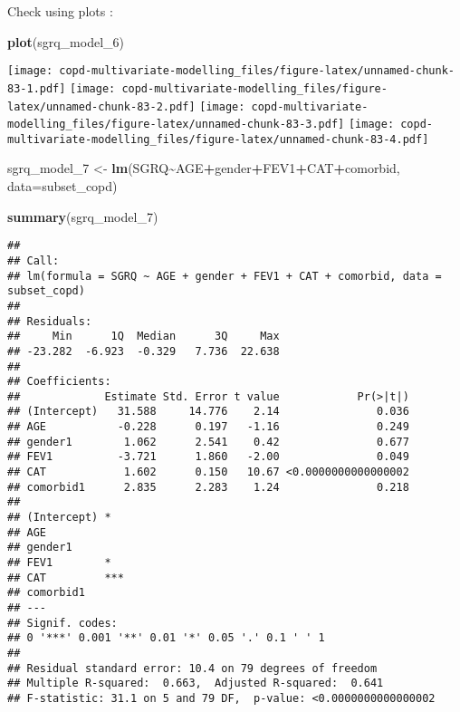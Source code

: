 \documentclass[
]{article}
\newenvironment{Shaded}{\begin{snugshade}}{\end{snugshade}}
\newcommand{\AttributeTok}[1]{\textcolor[rgb]{0.13,0.29,0.53}{#1}}
\newcommand{\FunctionTok}[1]{\textcolor[rgb]{0.13,0.29,0.53}{\textbf{#1}}}
\newcommand{\NormalTok}[1]{#1}
\newcommand{\OtherTok}[1]{\textcolor[rgb]{0.56,0.35,0.01}{#1}}
\newcommand{\SpecialCharTok}[1]{\textcolor[rgb]{0.81,0.36,0.00}{\textbf{#1}}}
\begin{document}
Check using plots :

\begin{Shaded}
\begin{Highlighting}[]
\FunctionTok{plot}\NormalTok{(sgrq\_model\_6)}
\end{Highlighting}
\end{Shaded}

\texttt{[image: copd-multivariate-modelling\_files/figure-latex/unnamed-chunk-83-1.pdf]}
\texttt{[image: copd-multivariate-modelling\_files/figure-latex/unnamed-chunk-83-2.pdf]}
\texttt{[image: copd-multivariate-modelling\_files/figure-latex/unnamed-chunk-83-3.pdf]}
\texttt{[image: copd-multivariate-modelling\_files/figure-latex/unnamed-chunk-83-4.pdf]}

\begin{Shaded}
\begin{Highlighting}[]
\NormalTok{sgrq\_model\_7 }\OtherTok{\textless{}{-}} \FunctionTok{lm}\NormalTok{(SGRQ}\SpecialCharTok{\textasciitilde{}}\NormalTok{AGE}\SpecialCharTok{+}\NormalTok{gender}\SpecialCharTok{+}\NormalTok{FEV1}\SpecialCharTok{+}\NormalTok{CAT}\SpecialCharTok{+}\NormalTok{comorbid, }\AttributeTok{data=}\NormalTok{subset\_copd)}
\end{Highlighting}
\end{Shaded}

\begin{Shaded}
\begin{Highlighting}[]
\FunctionTok{summary}\NormalTok{(sgrq\_model\_7)}
\end{Highlighting}
\end{Shaded}

\begin{verbatim}
## 
## Call:
## lm(formula = SGRQ ~ AGE + gender + FEV1 + CAT + comorbid, data = subset_copd)
## 
## Residuals:
##     Min      1Q  Median      3Q     Max 
## -23.282  -6.923  -0.329   7.736  22.638 
## 
## Coefficients:
##             Estimate Std. Error t value            Pr(>|t|)
## (Intercept)   31.588     14.776    2.14               0.036
## AGE           -0.228      0.197   -1.16               0.249
## gender1        1.062      2.541    0.42               0.677
## FEV1          -3.721      1.860   -2.00               0.049
## CAT            1.602      0.150   10.67 <0.0000000000000002
## comorbid1      2.835      2.283    1.24               0.218
##                
## (Intercept) *  
## AGE            
## gender1        
## FEV1        *  
## CAT         ***
## comorbid1      
## ---
## Signif. codes:  
## 0 '***' 0.001 '**' 0.01 '*' 0.05 '.' 0.1 ' ' 1
## 
## Residual standard error: 10.4 on 79 degrees of freedom
## Multiple R-squared:  0.663,  Adjusted R-squared:  0.641 
## F-statistic: 31.1 on 5 and 79 DF,  p-value: <0.0000000000000002
\end{verbatim}
\end{document}
